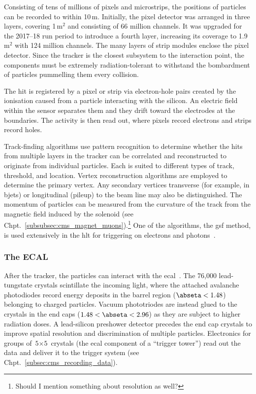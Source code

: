 Consisting of tens of millions of pixels and microstrips, the positions of particles can be recorded to within 10\,\si{\micro}m. Initially, the pixel detector was arranged in three layers, covering 1\,m$^2$ and consisting of 66 million channels. It was upgraded for the 2017--18 run period to introduce a fourth layer, increasing its coverage to 1.9\,m$^2$ with 124 million channels. The many layers of strip modules enclose the pixel detector. Since the tracker is the closest subsystem to the interaction point, the components must be extremely radiation-tolerant to withstand the bombardment of particles pummelling them every collision.

The hit is registered by a pixel or strip via electron-hole pairs created by the ionisation caused from a particle interacting with the silicon. An electric field within the sensor separates them and they drift toward the electrodes at the boundaries. The activity is then read out, where pixels record electrons and strips record holes.

Track-finding algorithms use pattern recognition to determine whether the hits from multiple layers in the tracker can be correlated and reconstructed to originate from individual particles. Each is suited to different types of track, \pt threshold, and location. Vertex reconstruction algorithms are employed to determine the primary vertex. Any secondary vertices transverse (for example, in \glspl{bjet}) or longitudinal (\gls{pileup}) to the beam line may also be distinguished. The momentum of particles can be measured from the curvature of the track from the magnetic field induced by the solenoid (see Chpt.~\ref{subsubsec:cms_magnet_muons}).\footnote{Should I mention something about resolution as well?} One of the algorithms, the \acrfull{gsf} method, is used extensively in the \acrshort{hlt} for triggering on electrons and photons~\cite{Anuar_2015}.




\subsubsection{The ECAL}
\label{subsubsec:cms_ecal}

After the tracker, the particles can interact with the \acrshort{ecal}~\cite{CERN-LHCC-97-033,Bloch:581342}. The 76,000 lead-tungstate crystals scintillate the incoming light, where the attached avalanche photodiodes record energy deposits in the barrel region ($\abseta < \text{1.48}$) belonging to charged particles. Vacuum phototriodes are instead glued to the crystals in the end caps ($\text{1.48} < \abseta < \text{2.96}$) as they are subject to higher radiation doses. A lead-silicon preshower detector precedes the end cap crystals to improve spatial resolution and discrimination of multiple particles. Electronics for groups of $\text{5}\times\text{5}$ crystals (the \acrshort{ecal} component of a ``trigger tower'') read out the data and deliver it to the trigger system (see Chpt.~\ref{subsec:cms_recording_data}).

